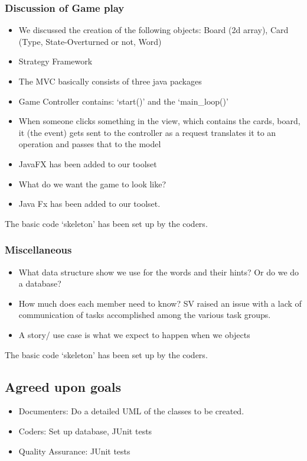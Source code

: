 \documentclass[12pt]{article}
\begin{document}
	\subsubsection{Discussion of Game play }
	\begin{itemize}
		\item We discussed the creation of the following objects: Board (2d array), Card (Type, State-Overturned or not, Word)
		\item Strategy Framework
		\item The MVC basically consists of three java packages
		\item Game Controller contains: ‘start()’ and the ‘main\_loop()’ 
		\item When someone clicks something in the view, which contains the cards, board, it (the event) gets sent to the controller as a request translates it to an operation and passes that to the model 
		\item JavaFX has been added to our toolset
		\item What do we want the game to look like? 
		\item Java Fx has been added to our toolset. 
		 
	\end{itemize}
	The basic code ‘skeleton’ has been set up by the coders. 
	
	\subsubsection{Miscellaneous }
	\begin{itemize}
		\item What data structure show we use for the words and their hints? Or do we do a database? 
		\item How much does each member need to know? SV raised an issue with a lack of communication of tasks accomplished among the various task groups.  
		\item A story/ use case is what we expect to happen when we objects 
				
	\end{itemize}
	The basic code ‘skeleton’ has been set up by the coders. 
	
	\subsection{Agreed upon goals}
	\begin{itemize}
		\item Documenters: Do a detailed UML of the classes to be created. 
		\item Coders: Set up database, JUnit tests 
		\item Quality Assurance: JUnit tests
	\end{itemize}
	\pagebreak
	
\end{document}
